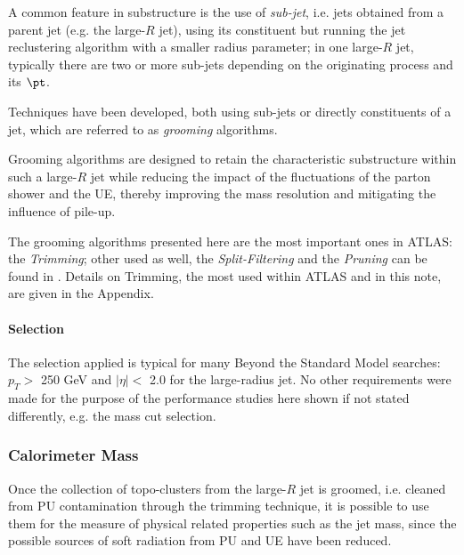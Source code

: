 A common feature in substructure is the use of \textit{sub-jet}, i.e. jets obtained from a parent jet (e.g. the large-$R$ jet), using its constituent but running the jet reclustering algorithm with a smaller radius parameter; in one large-$R$ jet, typically there are two or more sub-jets depending on the originating process and its $\pt$.

Techniques have been developed, both using sub-jets or directly constituents of a jet, which are referred to as \textit{grooming} algorithms.

Grooming algorithms are designed to retain the characteristic substructure within such a large-$R$
jet while reducing the impact of the fluctuations of the parton shower and the UE, thereby
improving the mass resolution and mitigating the influence of pile-up.

The grooming algorithms presented here are the most important ones in ATLAS: the \textit{Trimming}; other used as well, the \textit{Split-Filtering} and the \textit{Pruning} can be found in \cite{substructure1}. Details on Trimming, the most used within ATLAS and in this note, are given in the Appendix.

\paragraph{Selection}

The selection applied is typical for many Beyond the Standard Model searches: $p_T>$ 250 GeV and $|\eta|<$ 2.0 for the large-radius jet.
No other requirements were made for the purpose of the performance studies here shown if not stated differently, e.g. the mass cut selection.


\subsubsection{Calorimeter Mass}

Once the collection of topo-clusters from the large-$R$ jet is groomed, i.e. cleaned from PU contamination through the trimming technique, it is possible to use them for the measure of physical related properties such as the jet mass, since the possible sources of soft radiation from PU and UE have been reduced.


